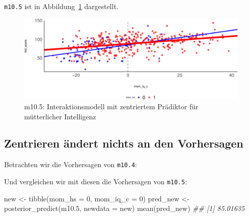\documentclass[
  a4paper,
  DIV=11]{scrreprt}
\newenvironment{Shaded}{\begin{snugshade}}{\end{snugshade}}
\newcommand{\AttributeTok}[1]{\textcolor[rgb]{0.40,0.45,0.13}{#1}}
\newcommand{\DecValTok}[1]{\textcolor[rgb]{0.68,0.00,0.00}{#1}}
\newcommand{\DocumentationTok}[1]{\textcolor[rgb]{0.37,0.37,0.37}{\textit{#1}}}
\newcommand{\FloatTok}[1]{\textcolor[rgb]{0.68,0.00,0.00}{#1}}
\newcommand{\FunctionTok}[1]{\textcolor[rgb]{0.28,0.35,0.67}{#1}}
\newcommand{\NormalTok}[1]{\textcolor[rgb]{0.00,0.23,0.31}{#1}}
\newcommand{\OtherTok}[1]{\textcolor[rgb]{0.00,0.23,0.31}{#1}}
\newcommand{\SpecialCharTok}[1]{\textcolor[rgb]{0.37,0.37,0.37}{#1}}
\theoremstyle{definition}
\theoremstyle{remark}
\begin{document}
\texttt{m10.5} ist in Abbildung~\ref{fig-m105} dargestellt.

\begin{figure}

{\centering \includegraphics{./metrische-AV_files/figure-pdf/fig-m105-1.pdf}

}

\caption{\label{fig-m105}m10.5: Interaktionsmodell mit zentriertem
Prädiktor für mütterlicher Intelligenz}

\end{figure}

\hypertarget{zentrieren-uxe4ndert-nichts-an-den-vorhersagen}{%
\subsection{Zentrieren ändert nichts an den
Vorhersagen}\label{zentrieren-uxe4ndert-nichts-an-den-vorhersagen}}

Betrachten wir die Vorhersagen von \texttt{m10.4}:

\begin{Shaded}
\end{Shaded}

Und vergleichen wir mit diesen die Vorhersagen von \texttt{m10.5}:

\begin{Shaded}
\begin{Highlighting}[]
\NormalTok{new }\OtherTok{\textless{}{-}} \FunctionTok{tibble}\NormalTok{(}\AttributeTok{mom\_hs =} \DecValTok{0}\NormalTok{, }\AttributeTok{mom\_iq\_c =} \DecValTok{0}\NormalTok{)}
\NormalTok{pred\_new }\OtherTok{\textless{}{-}} \FunctionTok{posterior\_predict}\NormalTok{(m10}\FloatTok{.5}\NormalTok{, }\AttributeTok{newdata =}\NormalTok{ new)}
\FunctionTok{mean}\NormalTok{(pred\_new)}
\DocumentationTok{\#\# [1] 85.01635}
\end{Highlighting}
\end{Shaded}
\end{document}
